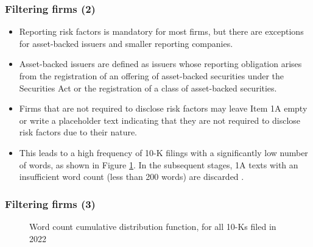 \documentclass{beamer}
\begin{document}
\begin{frame}
\frametitle{Filtering firms (2)}
\label{slide:nonfilingfirms}
\begin{itemize}
\item Reporting risk factors is mandatory for most firms, but there are exceptions for asset-backed issuers and smaller reporting companies.
\item Asset-backed issuers are defined as issuers whose reporting obligation arises from the registration of an offering of asset-backed securities under the Securities Act or the registration of a class of asset-backed securities.
\item Firms that are not required to disclose risk factors may leave Item 1A empty or write a placeholder text indicating that they are not required to disclose risk factors due to their nature.
\item This leads to a high frequency of 10-K filings with a significantly low number of words, as shown in Figure \ref{fig:cdf}. In the subsequent stages, 1A texts with an insufficient word count (less than 200 words) are discarded \hyperlink{slide:min_words}{}.
\end{itemize}
\end{frame}


\begin{frame}
\frametitle{Filtering firms (3)}
\label{slide:min_words}
\begin{figure}
  \centering
  \hfill
  \caption{Word count cumulative distribution function, for all 10-Ks filed in 2022}
  \label{fig:cdf}
\end{figure}
\end{frame}
\end{document}
